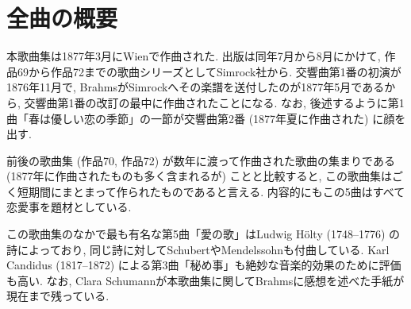 
\section*{全曲の概要}

本歌曲集は1877年3月にWienで作曲された\cite{library}\cite{denki}. 出版は同年7月から8月にかけて, 作品69から作品72までの歌曲シリーズとしてSimrock社から\cite{cd}.
交響曲第1番の初演が1876年11月で, BrahmsがSimrockへその楽譜を送付したのが1877年5月であるから,
交響曲第1番の改訂の最中に作曲されたことになる.
なお, 後述するように第1曲「春は優しい恋の季節」の一節が交響曲第2番 (1877年夏に作曲された) に顔を出す.

前後の歌曲集 (作品70, 作品72) が数年に渡って作曲された歌曲の集まりである (1877年に作曲されたものも多く含まれるが) こと\cite{taiyaku}と比較すると,
この歌曲集はごく短期間にまとまって作られたものであると言える.
内容的にもこの5曲はすべて恋愛事を題材としている.

この歌曲集のなかで最も有名な第5曲「愛の歌」はLudwig Hölty (1748--1776) の詩によっており,
同じ詩に対してSchubertやMendelssohnも付曲している.
Karl Candidus (1817--1872) による第3曲「秘め事」も絶妙な音楽的効果のために評価も高い.
なお, Clara Schumannが本歌曲集に関してBrahmsに感想を述べた手紙が現在まで残っている\cite{clara}.
